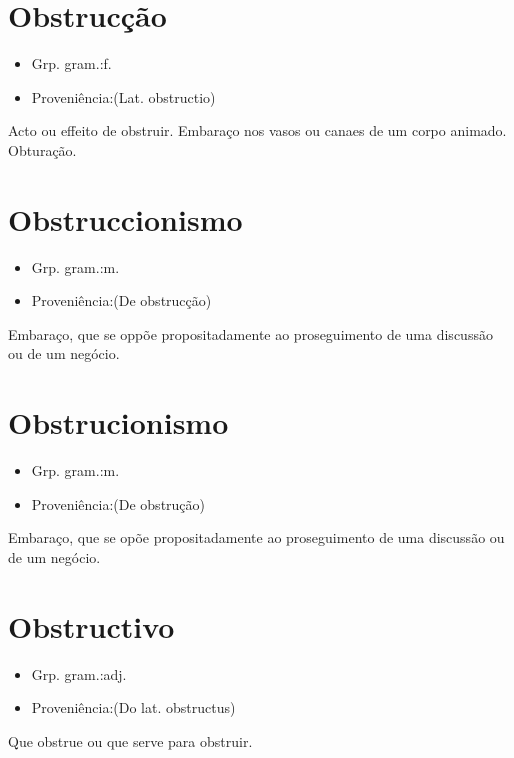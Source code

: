 \section{Obstrucção}
\begin{itemize}
\item {Grp. gram.:f.}
\end{itemize}
\begin{itemize}
\item {Proveniência:(Lat. \textunderscore obstructio\textunderscore )}
\end{itemize}
Acto ou effeito de obstruir.
Embaraço nos vasos ou canaes de um corpo animado.
Obturação.
\section{Obstruccionismo}
\begin{itemize}
\item {Grp. gram.:m.}
\end{itemize}
\begin{itemize}
\item {Proveniência:(De \textunderscore obstrucção\textunderscore )}
\end{itemize}
Embaraço, que se oppõe propositadamente ao proseguimento de uma discussão ou de um negócio.
\section{Obstrucionismo}
\begin{itemize}
\item {Grp. gram.:m.}
\end{itemize}
\begin{itemize}
\item {Proveniência:(De \textunderscore obstrução\textunderscore )}
\end{itemize}
Embaraço, que se opõe propositadamente ao proseguimento de uma discussão ou de um negócio.
\section{Obstructivo}
\begin{itemize}
\item {Grp. gram.:adj.}
\end{itemize}
\begin{itemize}
\item {Proveniência:(Do lat. \textunderscore obstructus\textunderscore )}
\end{itemize}
Que obstrue ou que serve para obstruir.
